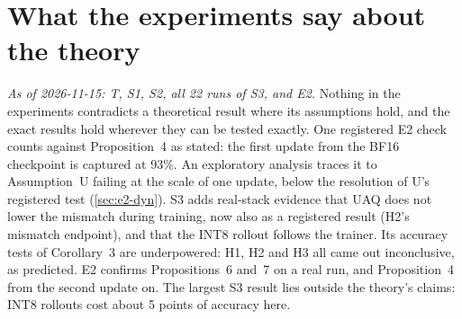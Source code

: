 \documentclass[11pt]{article}
\begin{document}
\section{What the experiments say about the theory}\label{sec:assessment}
\emph{As of 2026-11-15: T, S1, S2, all 22 runs of S3, and E2.} Nothing in the experiments contradicts a theoretical result where its assumptions hold, and the exact results hold wherever they can be tested exactly. One registered E2 check counts against Proposition~4 as stated: the first update from the BF16 checkpoint is captured at 93\%. An exploratory analysis traces it to Assumption~U failing at the scale of one update, below the resolution of U's registered test (\cref{sec:e2-dyn}). S3 adds real-stack evidence that UAQ does not lower the mismatch during training, now also as a registered result (H2's mismatch endpoint), and that the INT8 rollout follows the trainer. Its accuracy tests of Corollary~3 are underpowered: H1, H2 and H3 all came out inconclusive, as predicted. E2 confirms Propositions~6 and~7 on a real run, and Proposition~4 from the second update on. The largest S3 result lies outside the theory's claims: INT8 rollouts cost about 5 points of accuracy here.
\end{document}
